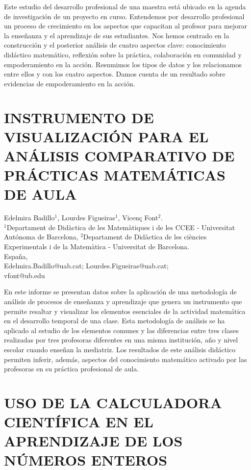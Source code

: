 Este estudio del desarrollo profesional de una maestra está ubicado
en la agenda de investigación de un proyecto en curso. Entendemos
por desarrollo profesional un proceso de crecimiento en los aspectos
que capacitan al profesor para mejorar la enseñanza y el aprendizaje
de sus estudiantes. Nos hemos centrado en la construcción y el posterior
análisis de cuatro aspectos clave: conocimiento didáctico matemático,
reflexión sobre la práctica, colaboración en comunidad y empoderamiento
en la acción. Resumimos los tipos de datos y los relacionamos entre
ellos y con los cuatro aspectos. Damos cuenta de un resultado sobre
evidencias de empoderamiento en la acción. 


\section{INSTRUMENTO DE VISUALIZACIÓN PARA EL ANÁLISIS COMPARATIVO DE PRÁCTICAS
MATEMÁTICAS DE AULA}

\begin{datos}
Edelmira Badillo$^1$, Lourdes Figueiras$^1$, Vicenç Font$^2$.\\
$^1$Departament de Didàctica de les Matemàtiques i de les CCEE - Universitat Autónoma de Barcelona, $^2$Departament de Didàctica de les ciències Experimentals i de la Matemàtica -  Universitat de Barcelona.\\
\hfill España, \\
\hfill Edelmira.Badillo@uab.cat; Lourdes.Figueiras@uab.cat;\\\hfill vfont@ub.edu 
\end{datos}

En este informe se presentan datos sobre la aplicación de una metodología
de análisis de procesos de enseñanza y aprendizaje que genera un instrumento
que permite resaltar y visualizar los elementos esenciales de la actividad
matemática en el desarrollo temporal de una clase. Esta metodología
de análisis se ha aplicado al estudio de los elementos comunes y las
diferencias entre tres clases realizadas por tres profesoras diferentes
en una misma institución, año y nivel escolar cuando enseñan la mediatriz.
Los resultados de este análisis didáctico permiten inferir, además,
aspectos del conocimiento matemático activado por las profesoras en
su práctica profesional de aula.


\section{USO DE LA CALCULADORA CIENTÍFICA EN EL APRENDIZAJE DE LOS NÚMEROS
ENTEROS }

